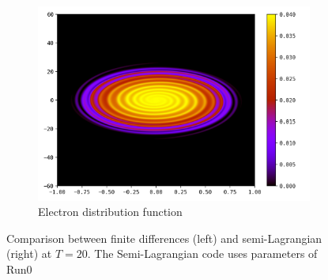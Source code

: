 \documentclass{article}
\numberwithin{equation}{section}
\newcommand{\imh}{\textheight} %
\newcommand{\imw}{\textwidth} %
\begin{document}
\begin{figure}
\begin{subfigure}{\textwidth}
		\includegraphics[height=\imh,width=\imw]{images/feT20_512.png}
		\caption{Electron distribution function}
		\label{subfig:compT02_electron}
	\end{subfigure}
	\caption{Comparison between finite differences (left) and semi-Lagrangian  (right) at $T=20$. The Semi-Lagrangian code uses parameters of Run0
	}
	\label{fig:compT20}
\end{figure}  
\end{document}

